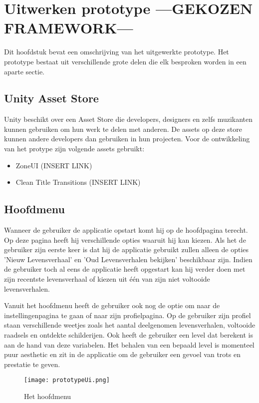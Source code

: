 \chapter{Uitwerken prototype ---GEKOZEN FRAMEWORK---}
\label{ch:prototype}

Dit hoofdstuk bevat een omschrijving van het uitgewerkte prototype. Het prototype bestaat uit verschillende grote delen die elk besproken worden in een aparte sectie.

\section{Unity Asset Store}
Unity beschikt over een Asset Store die developers, designers en zelfs muzikanten kunnen gebruiken om hun werk te delen met anderen. De assets op deze store kunnen andere developers dan gebruiken in hun projecten. Voor de ontwikkeling van het protype zijn volgende assets gebruikt:

\begin{itemize}
    \item ZoneUI (INSERT LINK)
    \item Clean Title Transitions (INSERT LINK)
\end{itemize}

\section{Hoofdmenu}
Wanneer de gebruiker de applicatie opstart komt hij op de hoofdpagina terecht. Op deze pagina heeft hij verschillende opties waaruit hij kan kiezen. Als het de gebruiker zijn eerste keer is dat hij de applicatie gebruikt zullen alleen de opties 'Nieuw Levensverhaal' en 'Oud Levensverhalen bekijken' beschikbaar zijn. Indien de gebruiker toch al eens de applicatie heeft opgestart kan hij verder doen met zijn recentste levensverhaal of kiezen uit één van zijn niet voltooide levensverhalen. 

Vanuit het hoofdmenu heeft de gebruiker ook nog de optie om naar de instellingenpagina te gaan of naar zijn profielpagina. Op de gebruiker zijn profiel staan verschillende weetjes zoals het aantal deelgenomen levensverhalen, voltooide raadsels en ontdekte schilderijen. Ook heeft de gebruiker een level dat berekent is aan de hand van deze variabelen. Het behalen van een bepaald level is momenteel puur aesthetic en zit in de applicatie om de gebruiker een gevoel van trots en prestatie te geven.

\begin{figure}
    \texttt{[image: prototypeUi.png]}
    \caption{Het hoofdmenu}
    \label{fig:prototypeUi}
\end{figure}

